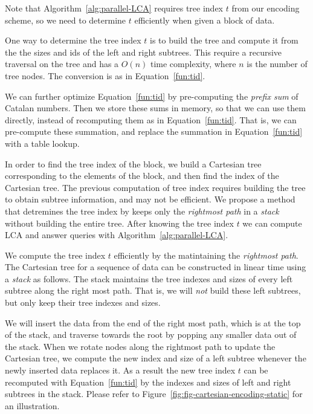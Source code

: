 Note that Algorithm~\ref{alg:parallel-LCA} requires tree index $t$
from our encoding scheme, so we need to determine $t$ efficiently when
given a block of data.


One way to determine the tree index $t$ is to build the tree and
compute it from the the sizes and ids of the left and right subtrees.
This require a recursive traversal on the tree and has a $O(n)$ time
complexity, where $n$ is the number of tree nodes.  The conversion is
as in Equation~\ref{fun:tid}.

% 



We can further optimize Equation~\ref{fun:tid} by pre-computing the
{\em prefix sum} of Catalan numbers.  Then we store these sums in
memory, so that we can use them directly, instead of recomputing them
as in Equation~\ref{fun:tid}.  That is, we can pre-compute these
summation, and replace the summation in Equation~\ref{fun:tid} with a
table lookup.


In order to find the tree index of the block, we build a Cartesian
tree corresponding to the elements of the block, and then find the
index of the Cartesian tree.  The previous computation of tree index
requires building the tree to obtain subtree information, and may not
be efficient.  We propose a method that detremines the tree index by
keeps only the {\em rightmost path} in a {\em stack} without building
the entire tree.  After knowing the tree index $t$ we can compute LCA
and answer queries with Algorithm~\ref{alg:parallel-LCA}.

We compute the tree index $t$ efficiently by the matintaining the {\em
  rightmost path}.  The Cartesian tree for a sequence of data can be
constructed in linear time using a {\em stack} as follows.  The stack
maintains the tree indexes and sizes of every left subtree along the
right most path.  That is, we will {\em not} build these left
subtrees, but only keep their tree indexes and sizes.

We will insert the data from the end of the right most path, which is at
the top of the stack, and traverse towards the root by popping any
smaller data out of the stack.  When we rotate nodes along the rightmost
path to update the Cartesian tree, we compute the new index and size of
a left subtree whenever the newly inserted data replaces it.  As a
result the new tree index $t$ can be recomputed with
Equation~\ref{fun:tid} by the indexes and sizes of left and right
subtrees in the stack.  Please refer to 
Figure~\ref{fig:fig-cartesian-encoding-static} for an illustration.

